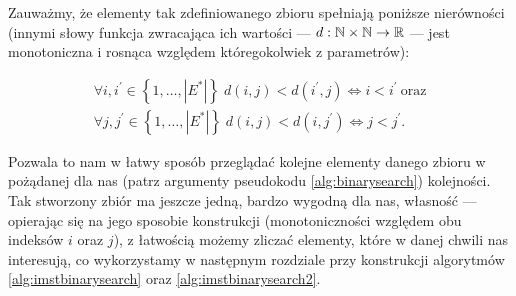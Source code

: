 Zauważmy, że elementy tak zdefiniowanego zbioru spełniają poniższe nierówności (innymi słowy funkcja zwracająca ich wartości --- $d: \mathbb{N} \times \mathbb{N} \rightarrow \mathbb{R}$ --- jest monotoniczna i rosnąca względem któregokolwiek z parametrów):

\begin{gather}\label{eq:ddiffvalues}
	\forall i, i^{\prime} \in \left\{ 1, \dots, \left| E^{\ast} \right| \right\} \; d \left( i, j \right) < d \left( i^{\prime}, j \right) \Leftrightarrow i < i^{\prime}~\text{oraz}\\
	\forall j, j^{\prime} \in \left\{ 1, \dots, \left| E^{\ast} \right| \right\} \; d \left( i, j \right) < d \left( i, j^{\prime} \right) \Leftrightarrow j < j^{\prime}\text{.}
\end{gather}

Pozwala to nam w łatwy sposób przeglądać kolejne elementy danego zbioru w pożądanej dla nas (patrz argumenty pseudokodu \ref{alg:binarysearch}) kolejności. Tak stworzony zbiór ma jeszcze jedną, bardzo wygodną dla nas, własność --- opierając się na jego sposobie konstrukcji (monotoniczności względem obu indeksów $i$ oraz $j$), z łatwością możemy zliczać elementy, które w danej chwili nas interesują, co wykorzystamy w następnym rozdziale przy konstrukcji algorytmów \ref{alg:imstbinarysearch} oraz \ref{alg:imstbinarysearch2}.

